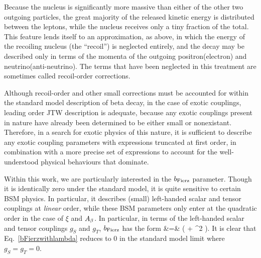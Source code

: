 Because the nucleus is significantly more massive than either of the other two outgoing particles, the great majority of the released kinetic energy is distributed between the leptons, while the nucleus receives only a tiny fraction of the total.  This feature lends itself to an approximation, as above, in which the energy of the recoiling nucleus (the ``recoil'') is neglected entirely, and the decay may be described only in terms of the momenta of the outgoing positron(electron) and neutrino(anti-neutrino).  
The terms that have been neglected in this treatment are sometimes called recoil-order corrections.

Although recoil-order and other small corrections must be accounted for within the standard model description of beta decay, in the case of exotic couplings, leading order \ac{JTW} description is adequate, because any exotic couplings present in nature have already been determined to be either small or nonexistant.  Therefore, in a search for exotic physics of this nature, it is sufficient to describe any exotic coupling parameters with expressions truncated at first order, in combination with a more precise set of expressions to account for the well-understood physical behaviours that dominate.  

Within this work, we are particularly interested in the $b_{\mathrm{Fierz}}$ parameter.  Though it is identically zero under the standard model, it is quite sensitive to certain \ac{BSM} physics.  In particular, it describes (small) left-handed scalar and tensor couplings at \emph{linear} order, while these \ac{BSM} parameters only enter at the quadratic order in the case of $\xi$ and $A_{\beta}$.  In particular, in terms of the left-handed scalar and tensor couplings $g_S$ and $g_T$, $b_{\mathrm{Fierz}}$ has the form 
\bea
\bFierz &=&  \left(  + \rho^2  \right). 
\label{bFierzwithlambda}
\eea
It is clear that Eq.~\ref{bFierzwithlambda} reduces to 0 in the standard model limit where $g_S = g_T = 0$.







